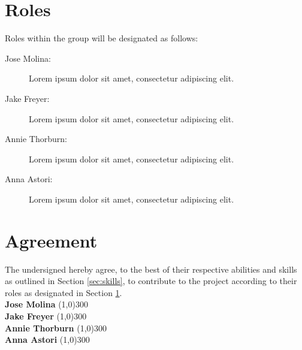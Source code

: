 \documentclass{article}
\newcommand{\groupmember}[1]{#1}
\newcommand{\role}[1]{#1}
\newcommand{\sigline}[2]{\vspace{2em} #1 \hfill \line(1,0){#2}}
\begin{document}
\section{Roles} %
\label{sec:roles}

Roles within the group will be designated as follows:

\begin{description}
    \item[\role{Jose Molina}:] Lorem ipsum dolor sit amet, consectetur adipiscing elit.
    \item[\role{Jake Freyer}:] Lorem ipsum dolor sit amet, consectetur adipiscing elit.
    \item[\role{Annie Thorburn}:] Lorem ipsum dolor sit amet, consectetur adipiscing elit.
    \item[\role{Anna Astori}:] Lorem ipsum dolor sit amet, consectetur adipiscing elit.

\end{description}

\section{Agreement} %
\label{par:agreement}
The undersigned hereby agree, to the best of their respective abilities and skills as outlined in Section \ref{sec:skills}, to contribute to the project according to their roles as designated in Section \ref{sec:roles}.%
\vspace{2em}\\
\sigline{\textbf{\groupmember{Jose Molina}}}{300}\\
\sigline{\textbf{\groupmember{Jake Freyer}}}{300}\\
\sigline{\textbf{\groupmember{Annie Thorburn}}}{300}\\
\sigline{\textbf{\groupmember{Anna Astori}}}{300}\\
\end{document}
